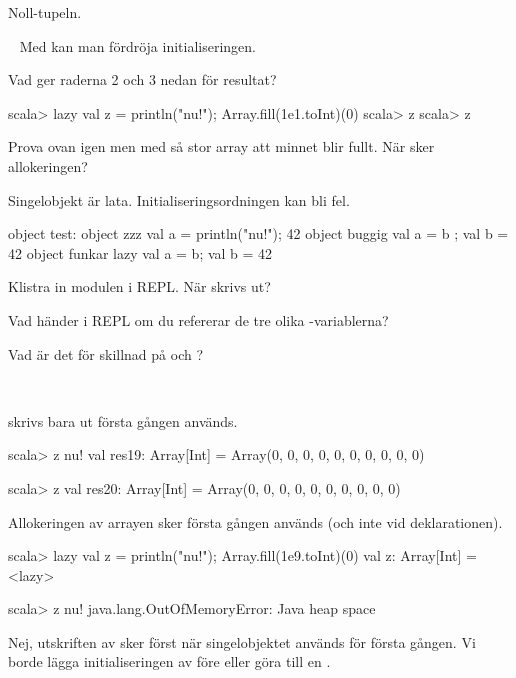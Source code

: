 \SubtaskSolved Noll-tupeln.

\QUESTEND



\QUESTBEGIN

\Task \what~ Med  kan man fördröja initialiseringen.

\Subtask Vad ger raderna 2 och 3 nedan för resultat?
\begin{REPL}
scala> lazy val z = { println("nu!"); Array.fill(1e1.toInt)(0)}
scala> z
scala> z
\end{REPL}

\Subtask Prova ovan igen men med så stor array att minnet blir fullt. När sker allokeringen?

\Subtask Singelobjekt är lata. Initialiseringsordningen kan bli fel.
\begin{Code}
object test:
  object zzz    { val a = { println("nu!"); 42} }
  object buggig { val a = b ; val b = 42        }
  object funkar { lazy val a = b; val b = 42    }
\end{Code}
\noindent Klistra in modulen  i REPL. När skrivs  ut?

\Subtask Vad händer i REPL om du refererar de tre olika -variablerna?

\Subtask Vad är det för skillnad på  och ?

\SOLUTION

\TaskSolved \what~

\SubtaskSolved {} skrivs bara ut första gången  används.
\begin{REPL}
scala> z
nu!
val res19: Array[Int] = Array(0, 0, 0, 0, 0, 0, 0, 0, 0, 0)

scala> z
val res20: Array[Int] = Array(0, 0, 0, 0, 0, 0, 0, 0, 0, 0)
\end{REPL}

\SubtaskSolved Allokeringen av arrayen sker första gången  används (och inte vid deklarationen).
\begin{REPL}
scala> lazy val z = { println("nu!"); Array.fill(1e9.toInt)(0)}
val z: Array[Int] = <lazy>

scala> z
nu!
java.lang.OutOfMemoryError: Java heap space
\end{REPL}

\SubtaskSolved Nej, utskriften av  sker först när singelobjektet  används för första gången. Vi borde lägga initialiseringen av  före  eller göra  till en .

